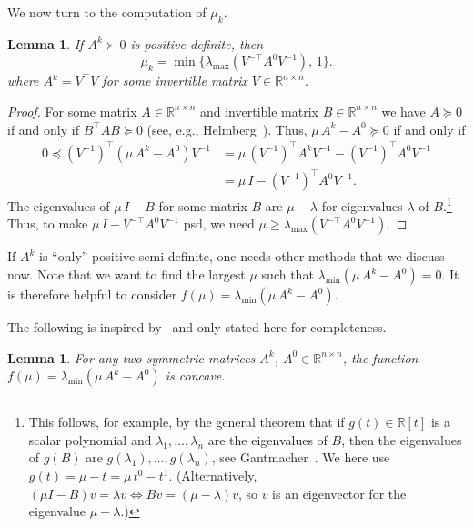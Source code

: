 \documentclass[10pt, a4paper]{article}
\newcommand{\T}{^{\top}}
\newcommand{\R}{\mathds{R}}
\newtheorem{lemma}[theorem]{Lemma}
\begin{document}
We now turn to the computation of $\mu_k$.

\begin{lemma}\label{lem:TightenPosDef}
  If $A^k \succ 0$ is positive definite, then
  \[
    \mu_k = \min \big\{ \lambda_{\max}(V^{-\top} A^0 V^{-1}),\, 1\big\}.
  \]
  where $A^k = V\T V$ for some invertible matrix $V \in \R^{n \times n}$.
\end{lemma}

\begin{proof}
  For some matrix $A \in \R^{n \times n}$ and invertible matrix
  $B \in \R^{n \times n}$ we have $A \succeq 0$ if and only if
  $B\T A B \succeq 0$ (see, e.g., Helmberg~\cite[Prop.~1.1.7]{Hel00}).
  Thus, $\mu\, A^k - A^0 \succeq 0$ if and only if
  \begin{align*}
    0 \preceq (V^{-1})^\top (\mu\, A^k - A^0) V^{-1} &= \mu\,
    (V^{-1})^\top A^k V^{-1} - (V^{-1})^\top A^0 V^{-1} \\
    &= \mu\, I - (V^{-1})^\top A^0 V^{-1}.
  \end{align*}
  The eigenvalues of $\mu\, I - B$ for some matrix $B$ are $\mu - \lambda$
  for eigenvalues $\lambda$ of $B$.\footnote{This follows, for example, by the
    general theorem that if $g(t) \in \R[t]$ is a scalar polynomial and
    $\lambda_1, \dots, \lambda_n$ are the eigenvalues of $B$, then the
    eigenvalues of $g(B)$ are $g(\lambda_1), \dots, g(\lambda_n)$, see
    Gantmacher~\cite[Ch.~IV, Thm.~3]{Gan59I}. We here use
    $g(t) = \mu - t = \mu\, t^0 - t^1$. (Alternatively, $(\mu I - B)v =
    \lambda v \Leftrightarrow Bv = (\mu - \lambda)v$, so $v$ is an
    eigenvector for the eigenvalue $\mu - \lambda$.)}  Thus, to make
  $\mu\, I - V^{-\top} A^0 V^{-1}$ psd, we need
  $\mu \geq \lambda_{\max}(V^{-\top} A^0 V^{-1})$.
\end{proof}

If $A^k$ is ``only'' positive semi-definite, one needs other methods that
we discuss now. Note that we want to find the largest $\mu$ such that
$\lambda_{\min}(\mu\, A^k - A^0) = 0$. It is therefore helpful to consider
$f(\mu) = \lambda_{\min}(\mu\, A^k - A^0)$.

The following is inspired by~\cite{Str16,HigSS16} and only stated here for completeness.

\begin{lemma}
  For any two symmetric matrices $A^k$, $A^0 \in \R^{n \times n}$, the function
  $f(\mu) = \lambda_{\min}(\mu\, A^k - A^0)$ is concave.
\end{lemma}
\end{document}
